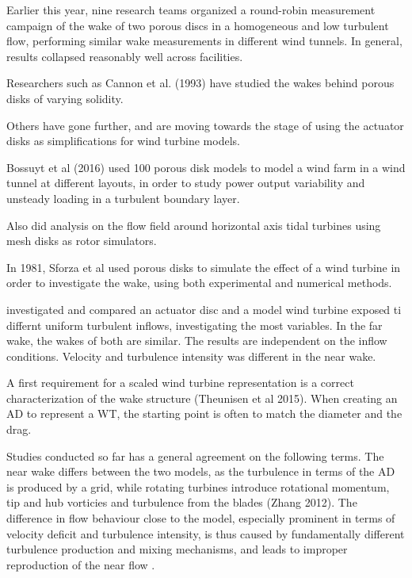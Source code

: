 Earlier this year, nine research teams organized a round-robin measurement campaign of the wake of two porous discs in a homogeneous and low turbulent flow, performing similar wake measurements in different wind tunnels. \cite{Aubrun2019} In general, results collapsed reasonably well across facilities. 

Researchers such as Cannon et al. (1993) \cite{Cannon1993} have studied the wakes behind porous disks of varying solidity.

Others have gone further, and are moving towards the stage of using the actuator disks as simplifications for wind turbine models. 

Bossuyt et al (2016) \cite{Bossuyt2016} used 100 porous disk models to model a wind farm in a wind tunnel at different layouts, in order to study power output variability and unsteady loading in a turbulent boundary layer.  

Also \cite{Myers2010} did analysis on the flow field around horizontal axis tidal turbines using mesh disks as rotor simulators. 

In 1981, Sforza et al \cite{Sforza1981} used porous disks to simulate the effect of a wind turbine in order to investigate the wake, using both experimental and numerical methods.

\cite{Neunaber} investigated and compared an actuator disc and a model wind turbine exposed ti differnt uniform turbulent inflows, investigating the most variables. In the far wake, the wakes of both are similar. The results are independent on the inflow conditions. Velocity and turbulence intensity was different in the near wake. 



A first requirement for a scaled wind turbine representation is a correct characterization of the wake structure (Theunisen et al 2015). When creating an AD to represent a WT, the starting point is often to match the diameter and the drag. 

Studies conducted so far has a general agreement on the following terms. The near wake differs between the two models, as the turbulence in terms of the AD is produced by a grid, while rotating turbines introduce rotational momentum, tip and hub vorticies and turbulence from the blades (Zhang 2012). The difference in flow behaviour close to the model, especially prominent in terms of velocity deficit and turbulence intensity, is thus caused by fundamentally different turbulence production and mixing mechanisms, and leads to improper reproduction of the near flow \cite{Aubrun2019}. 

